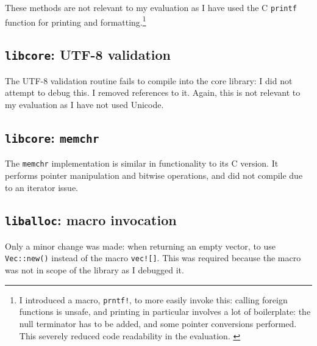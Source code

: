 \documentclass[dissertation.tex]{subfiles}
\begin{document}
These methods are not relevant to my evaluation as I have used the C
\texttt{printf} function for printing and formatting.\footnote{
I introduced a macro, \texttt{prntf!}, to more easily invoke this:
calling foreign functions is unsafe, and printing in particular involves
a lot of boilerplate: the null terminator has to be added, and some
pointer conversions performed.
This severely reduced code readability in the evaluation.
\label{foot:prntf}
}


\subsection{\texttt{libcore}: UTF-8 validation}
The UTF-8 validation routine fails to compile into the core library: I
did not attempt to debug this.
I removed references to it.
Again, this is not relevant to my evaluation as I have not used Unicode.


\subsection{\texttt{libcore}: \texttt{memchr}}
The \texttt{memchr} implementation is similar in functionality to its C
version.
It performs pointer manipulation and bitwise operations, and did not
compile due to an iterator issue.


\subsection{\texttt{liballoc}: macro invocation}
Only a minor change was made: when returning an empty vector, to use
\texttt{Vec::new()} instead of the macro \texttt{vec![]}.
This was required because the macro was not in scope of the library as I
debugged it.
\end{document}
